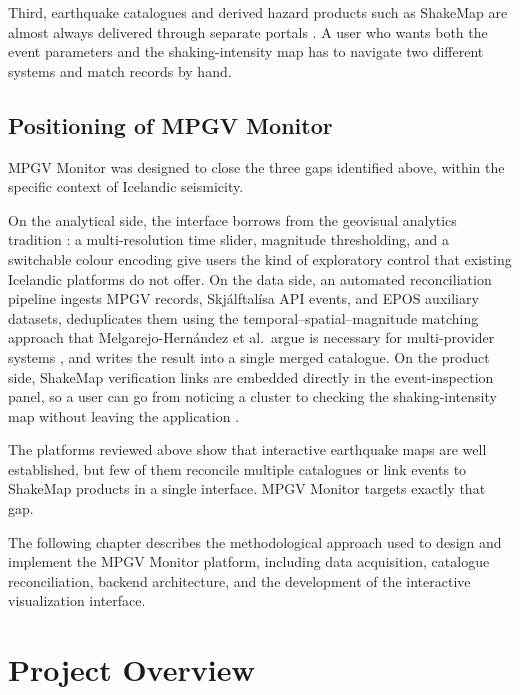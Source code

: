 \documentclass[12pt]{article}
\begin{document}
Third, earthquake catalogues and derived hazard products such as ShakeMap are almost always delivered through separate portals \cite{Wald2005ShakeMap}. A user who wants both the event parameters and the shaking-intensity map has to navigate two different systems and match records by hand.

\subsection{Positioning of MPGV Monitor}

MPGV Monitor was designed to close the three gaps identified above, within the specific context of Icelandic seismicity.

On the analytical side, the interface borrows from the geovisual analytics tradition \cite{Andrienko2007Geovisual, MacEachren2004Geovisualization, Andrienko2007Visual}: a multi-resolution time slider, magnitude thresholding, and a switchable colour encoding give users the kind of exploratory control that existing Icelandic platforms do not offer. On the data side, an automated reconciliation pipeline ingests MPGV records, Skjálftalísa API events, and EPOS auxiliary datasets, deduplicates them using the temporal--spatial--magnitude matching approach that Melgarejo-Hern{\'a}ndez et al.\ argue is necessary for multi-provider systems \cite{MelgarejoHernandez2026}, and writes the result into a single merged catalogue. On the product side, ShakeMap verification links are embedded directly in the event-inspection panel, so a user can go from noticing a cluster to checking the shaking-intensity map without leaving the application \cite{Wald2005ShakeMap}.

The platforms reviewed above show that interactive earthquake maps are well established, but few of them reconcile multiple catalogues or link events to ShakeMap products in a single interface. MPGV Monitor targets exactly that gap.

The following chapter describes the methodological approach used to design and implement the MPGV Monitor platform, including data acquisition, catalogue reconciliation, backend architecture, and the development of the interactive visualization interface.


\section{Project Overview}
\end{document}
